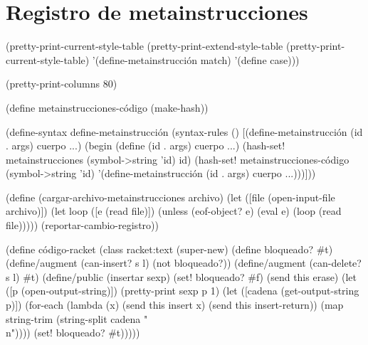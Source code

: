 \documentclass[10pt,oneside,openany,letterpaper]{book}
\begin{document}
\section{Registro de metainstrucciones}


\nwenddocs{}\endmoddef
(pretty-print-current-style-table
 (pretty-print-extend-style-table (pretty-print-current-style-table)
                                  '(define-metainstrucción match)
                                  '(define case)))

(pretty-print-columns 80)

(define metainstrucciones-código (make-hash))

(define-syntax define-metainstrucción
  (syntax-rules ()
    [(define-metainstrucción (id . args) cuerpo ...)
     (begin (define (id . args) cuerpo ...)
            (hash-set! metainstrucciones
                       (symbol->string 'id)
                       id)
            (hash-set! metainstrucciones-código
                       (symbol->string 'id)
                       '(define-metainstrucción (id . args) cuerpo ...)))]))

(define (cargar-archivo-metainstrucciones archivo)
  (let ([file (open-input-file archivo)])
    (let loop ([e (read file)])
      (unless (eof-object? e)
        (eval e)
        (loop (read file)))))
  (reportar-cambio-registro))

(define código-racket%
  (class racket:text%
    (super-new)
    (define bloqueado? #t)
    (define/augment (can-insert? s l) (not bloqueado?))
    (define/augment (can-delete? s l) #t)
    (define/public (insertar sexp)
      (set! bloqueado? #f)
      (send this erase)
      (let ([p (open-output-string)])
        (pretty-print sexp p 1)
        (let ([cadena (get-output-string p)])
          (for-each (lambda (x)
                      (send this insert x)
                      (send this insert-return))
                    (map string-trim (string-split cadena "\\n"))))
      (set! bloqueado? #t)))))
\nwendcode{}\nwdocspar
\end{document}
